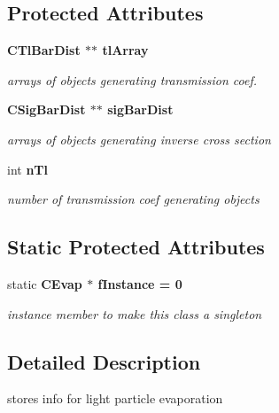 \subsection*{Protected Attributes}
\begin{CompactItemize}
\item 
\bf{CTl\-Bar\-Dist} $\ast$$\ast$ \bf{tl\-Array}\label{classCEvap_cbc790b16a612d40ee0c5ef07bd6d979}

\begin{CompactList}\small\item\em arrays of objects generating transmission coef. \item\end{CompactList}\item 
\bf{CSig\-Bar\-Dist} $\ast$$\ast$ \bf{sig\-Bar\-Dist}\label{classCEvap_24f6bca6aa46e8827332806cd1f3a9e6}

\begin{CompactList}\small\item\em arrays of objects generating inverse cross section \item\end{CompactList}\item 
int \bf{n\-Tl}\label{classCEvap_eaa49009f3e2afb26b390690babc7d0f}

\begin{CompactList}\small\item\em number of transmission coef generating objects \item\end{CompactList}\end{CompactItemize}
\subsection*{Static Protected Attributes}
\begin{CompactItemize}
\item 
static \bf{CEvap} $\ast$ \bf{f\-Instance} = 0\label{classCEvap_00f7ca875136d0ba0d26b6648aa4ade7}

\begin{CompactList}\small\item\em instance member to make this class a singleton \item\end{CompactList}\end{CompactItemize}


\subsection{Detailed Description}
stores info for light particle evaporation 

